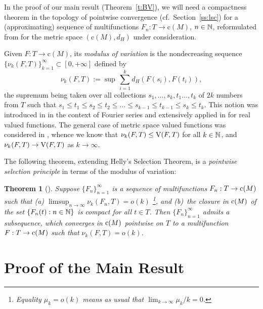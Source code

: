 \documentclass[preprint,12pt]{elsarticle}
\newtheorem{thrm}{Theorem}
\newcommand{\nV}{\mbox{\rm V}}
\begin{document}
In the proof of our main result (Theorem~\ref{t:BV}), we will need a compactness
theorem in the topology of pointwise convergence (cf.\ Section~\ref{ss:lsc}) for a
(approximating) sequence of multifunctions $F_n:T\to\mbox{c}(M)$, $n\in\mathbb{N}$,
reformulated from \cite{JMAA05} for the metric space $(\mbox{c}(M),d_H)$
under consideration.

Given $F:T\to\mbox{c}(M)$, its \emph{modulus of variation\/} is the nondecreasing
sequence $\{\nu_k(F,T)\}_{k=1}^\infty\subset[0,+\infty]$ defined by
  \begin{equation*}
\nu_k(F,T)\!:=\sup\,\sum_{i=1}^k d_H(F(s_i),F(t_i)),
  \end{equation*}
the supremum being taken over all collections $s_1,\dots,s_k,t_1\dots,t_k$ of $2k$
numbers from $T$ such that $s_1\le t_1\le s_2\le t_2\le\dots\le s_{k-1}\le t_{k-1}%
\le s_k\le t_k$. This notion was introduced in \cite{Chantur} in the context of Fourier
series and extensively applied in \cite[Section~11.3]{GNW} for real valued functions.
The general case of metric space valued functions was considered in \cite{JMAA05},
whence we know that $\nu_k(F,T)\le\nV(F,T)$ for all $k\in\mathbb{N}$, and
$\nu_k(F,T)\to\nV(F,T)$ as $k\to\infty$.

The following theorem, extending Helly's Selection Theorem, is a \emph{pointwise
selection principle\/} in terms of the modulus of variation:

\begin{thrm}[{\cite[Theorem~1]{JMAA05}}] \label{t:B}
Suppose $\{F_n\}_{n=1}^\infty$ is a sequence of multifunctions
$F_n:T\to\mbox{\rm c}(M)$ such that\/
{\rm(a)} $\limsup_{n\to\infty}\nu_k(F_n,T)=o(k)$%
\footnote{Equality $\mu_k=o(k)$ means as usual that $\lim_{k\to\infty}\mu_k/k=0$.},
and\/ {\rm(b)}~the closure in $\mbox{\rm c}(M)$ of the set $\{F_n(t):n\in\mathbb{N}\}$
is compact for all $t\in T$. Then $\{F_n\}_{n=1}^\infty$ admits a subsequence,
which converges in $\mbox{\rm c}(M)$ pointwise on $T$ to a multifunction
$F:T\to\mbox{\rm c}(M)$ such that $\nu_k(F,T)=o(k)$.
\end{thrm}

\section{Proof of the Main Result} \label{s:pro}
\end{document}
